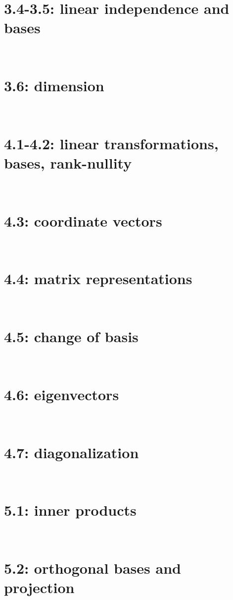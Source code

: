 \documentclass[11pt]{amsart}
\theoremstyle{definition}
\theoremstyle{named}
\numberwithin{myalgctr}{section}
\begin{document}
\section*{3.4-3.5: linear independence and bases}


\setcounter{exercises@solutionnumber}{1}
\ \\
\section*{3.6: dimension}


\setcounter{exercises@solutionnumber}{1}
\ \\
\section*{4.1-4.2: linear transformations, bases, rank-nullity}  \label{S:basissection}


\setcounter{exercises@solutionnumber}{1}
\ \\
\section*{4.3: coordinate vectors}  \label{S:basissection}


\setcounter{exercises@solutionnumber}{1}
\ \\
\section*{4.4: matrix representations}  \label{S:basissection}

\setcounter{exercises@solutionnumber}{1}
\ \\
\section*{4.5: change of basis}  \label{S:basissection}

\setcounter{exercises@solutionnumber}{1}
\ \\
\section*{4.6: eigenvectors}  \label{S:basissection}


	\setcounter{exercises@solutionnumber}{1}
\ \\
\section*{4.7: diagonalization}  \label{S:basissection}


\setcounter{exercises@solutionnumber}{1}
\ \\
\section*{5.1: inner products}\label{S:innerproduct}


\setcounter{exercises@solutionnumber}{1}
\ \\
\section*{5.2: orthogonal bases and projection}\label{S:orthogonal}

\end{document}
